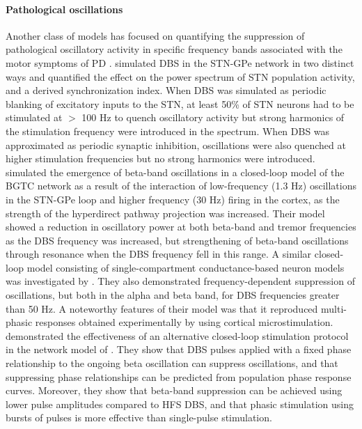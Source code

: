 \paragraph{Pathological oscillations}
Another class of models has focused on quantifying the suppression of pathological
oscillatory activity in specific frequency bands associated with the motor symptoms of PD
\cite{kumar_role_2011,kang_interaction_2013,kang_effects_2014,kumaravelu_biophysical_2016,holt_phasic_2016,popovych_pulsatile_2017,anderson_action_2018}.
\cite{kumar_role_2011} simulated DBS in the STN-GPe network in two distinct ways and quantified
the effect on the power spectrum of STN population activity, and a derived synchronization index.
When DBS was simulated as periodic blanking of excitatory inputs to the STN, at least 50\%
of STN neurons had to be stimulated at $>$ 100 Hz to quench oscillatory activity but strong harmonics
of the stimulation frequency were introduced in the spectrum. When DBS was approximated as periodic
synaptic inhibition, oscillations were also quenched at higher stimulation frequencies but no
strong harmonics were introduced.
%
\cite{kang_interaction_2013} simulated the emergence of beta-band oscillations in a closed-loop model
of the BGTC network as a result of the interaction of low-frequency (1.3 Hz) oscillations in the
STN-GPe loop and higher frequency (30 Hz) firing in the cortex, as the strength of the hyperdirect
pathway projection was increased. Their model showed a reduction in oscillatory power at both beta-band
and tremor frequencies as the DBS frequency was increased, but strengthening of beta-band oscillations
through resonance when the DBS frequency fell in this range.
%
A similar closed-loop model consisting of single-compartment conductance-based neuron models was
investigated by \cite{kumaravelu_biophysical_2016}. They also demonstrated frequency-dependent
suppression of oscillations, but both in the alpha and beta band, for DBS frequencies
greater than 50 Hz. A noteworthy features of their model was that it reproduced multi-phasic
responses obtained experimentally by \cite{kita_cortical_2011} using cortical microstimulation.
%
\cite{holt_phasic_2016} demonstrated the effectiveness of an alternative closed-loop
stimulation protocol in the network model of \cite{hahn_modeling_2010}.
They show that DBS pulses applied with a fixed phase relationship to the ongoing beta
oscillation can suppress oscillations, and that suppressing phase relationships can be
predicted from population phase response curves. Moreover, they show that beta-band
suppression can be achieved using lower pulse amplitudes compared to HFS DBS, and that
phasic stimulation using bursts of pulses is more effective than single-pulse stimulation.
%

